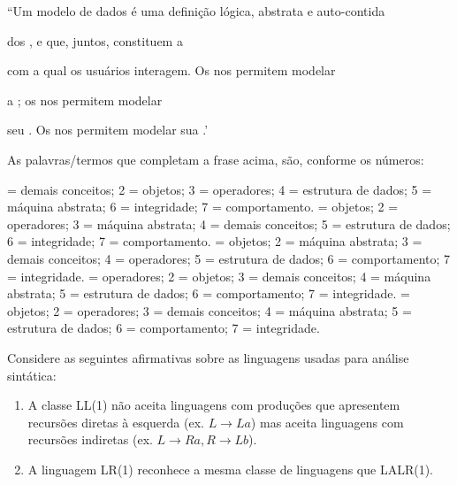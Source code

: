 \documentclass[12pt, addpoints]{exam}
\begin{document}
    \begin{questions}

    \newpage
    \question

``Um modelo de dados é uma definição lógica, abstrata e auto-contida

dos ,  e  que, juntos, constituem a 

com a qual os usuários interagem. Os  nos permitem modelar

a ; os  nos permitem modelar

seu . Os  nos permitem modelar sua .'



As palavras/termos que completam a frase acima, são, conforme os números:


\begin{choices}
 = demais conceitos; 2 = objetos; 3 = operadores; 4 = estrutura de dados; 5 = máquina abstrata; 6 = integridade; 7 = comportamento.
 = objetos; 2 = operadores; 3 = máquina abstrata; 4 = demais conceitos; 5 = estrutura de dados; 6 = integridade; 7 = comportamento.
 = objetos; 2 = máquina abstrata; 3 = demais conceitos; 4 = operadores; 5 = estrutura de dados; 6 = comportamento; 7 = integridade.
 = operadores; 2 = objetos; 3 = demais conceitos; 4 = máquina abstrata; 5 = estrutura de dados; 6 = comportamento; 7 = integridade.
 = objetos; 2 = operadores; 3 = demais conceitos; 4 = máquina abstrata; 5 = estrutura de dados; 6 = comportamento; 7 = integridade.
\end{choices}

\question

Considere as seguintes afirmativas sobre as linguagens usadas para análise sintática:

\begin{enumerate}[label=\Roman*.]

    \item A classe LL(1) não aceita linguagens com produções que apresentem recursões diretas à esquerda (ex. \(L \rightarrow La\)) mas aceita linguagens com recursões indiretas (ex. \(L \rightarrow Ra, R \rightarrow Lb\)).

    \item A linguagem LR(1) reconhece a mesma classe de linguagens que LALR(1).


\end{enumerate}
\end{questions}
\end{document}
